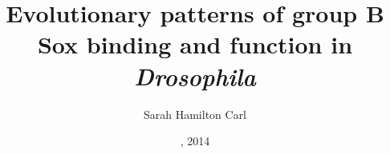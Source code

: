 
\title{Evolutionary patterns of group B Sox binding and function in \emph{Drosophila}}

\author{Sarah Hamilton Carl}





\date{, 2014}
